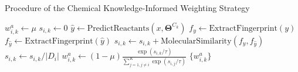 \begin{algorithm}[t]
    \caption{Procedure of the Chemical Knowledge-Informed Weighting Strategy}
    \label{alg:ckiw}
    \begin{algorithmic}[1]
                \State $w_{i,k}^a \leftarrow \mu$
            \Else
                \State $s_{i,k} \leftarrow 0$
                    \State $\hat{y} \leftarrow \text{PredictReactants}(x, \bm{\Theta}^{C_k})$
                    \State $f_y \leftarrow \text{ExtractFingerprint}(y)$
                    \State $f_{\hat{y}} \leftarrow \text{ExtractFingerprint}(\hat{y})$
                    \State $s_{i,k} \leftarrow s_{i,k} + \text{MolecularSimilarity}(f_y, f_{\hat{y}})$
                \EndFor
                \State $s_{i,k} \leftarrow s_{i,k} / |D_i|$
            \EndIf
        \EndFor
            \State $w_{i,k}^a \leftarrow (1-\mu)\frac{\exp(s_{i,k} / \tau)}{\sum_{j=1,j\neq i}^{K}\exp(s_{i,j}/ \tau)}$
        \EndFor
    \EndFor
    \State \Return $\{w_{i,k}^a\}$
    \end{algorithmic}
\end{algorithm}


